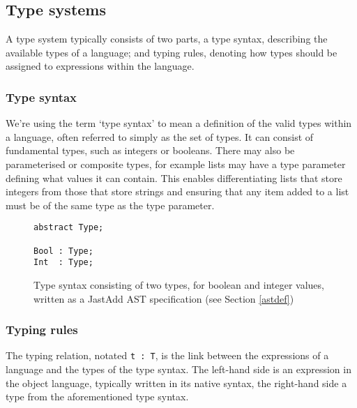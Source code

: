 \documentclass[nofilelist]{cslthse-msc}
\newcommand{\CR}[1]{\textcolor{green!60!black}{[\textbf{CR}:#1]}}
\newcommand{\reviewquestion}[1]{\textcolor{red!80!black}{[\textbf{Review question}:#1]}}
\begin{document}
\subsection{Type systems}
A type system typically consists of two parts, a type syntax, describing the available types of a language; and typing rules, denoting how types should be assigned to expressions within the language.

\subsubsection{Type syntax}\label{typesyntax}
We're using the term `type syntax' to mean a definition of the valid types within a language, often referred to simply as the set of types.
It can consist of fundamental types, such as integers or booleans.
There may also be parameterised or composite types, for example lists may have a type parameter defining what values it can contain.
This enables differentiating lists that store integers from those that store strings and ensuring that any item added to a list must be of the same type as the type parameter.
\begin{figure}[h]
\begin{lstlisting}[]
abstract Type;

Bool : Type;
Int  : Type;
\end{lstlisting}
  \caption{Type syntax consisting of two types, for boolean and integer values, written as a JastAdd AST specification (see Section \ref{astdef})}
  \label{typesyntaxspec}
\end{figure}

\subsubsection{Typing rules}
The typing relation, notated \lstinline{t : T}, is the link between the expressions of a language and the types of the type syntax.
The left-hand side is an expression in the object language, typically written in its native syntax, the right-hand side a type from the aforementioned type syntax.
\end{document}
